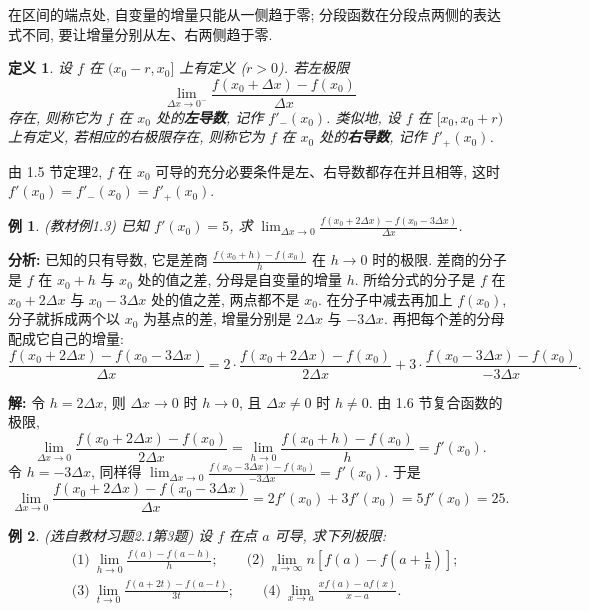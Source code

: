 \documentclass[UTF8,openany]{ctexbook}
\theoremstyle{chinesetextbook}
\newtheorem{definition}{定义}[section]
\newtheorem{example}{例}[section]
\newenvironment{cnsolution}{\par\indent\textbf{解:} \ignorespaces}{\par}
\begin{document}
在区间的端点处, 自变量的增量只能从一侧趋于零; 分段函数在分段点两侧的表达式不同, 要让增量分别从左、右两侧趋于零.
\begin{definition}
设 $f$ 在 $(x_0-r,x_0]$ 上有定义 ($r>0$). 若左极限
\[
\lim_{\Delta x\to0^-}\frac{f(x_0+\Delta x)-f(x_0)}{\Delta x}
\]
存在, 则称它为 $f$ 在 $x_0$ 处的\textbf{左导数}, 记作 $f'_-(x_0)$. 类似地, 设 $f$ 在 $[x_0,x_0+r)$ 上有定义, 若相应的右极限存在, 则称它为 $f$ 在 $x_0$ 处的\textbf{右导数}, 记作 $f'_+(x_0)$.
\end{definition}
由 1.5 节定理2, $f$ 在 $x_0$ 可导的充分必要条件是左、右导数都存在并且相等, 这时 $f'(x_0)=f'_-(x_0)=f'_+(x_0)$.
\begin{example}\label{ex:c2-1-3}
\textnormal{(教材例1.3)} 已知 $f'(x_0)=5$, 求 $\displaystyle\lim_{\Delta x\to0}\frac{f(x_0+2\Delta x)-f(x_0-3\Delta x)}{\Delta x}$.
\end{example}
\par\indent\textbf{分析:} 已知的只有导数, 它是差商 $\displaystyle\frac{f(x_0+h)-f(x_0)}h$ 在 $h\to0$ 时的极限. 差商的分子是 $f$ 在 $x_0+h$ 与 $x_0$ 处的值之差, 分母是自变量的增量 $h$. 所给分式的分子是 $f$ 在 $x_0+2\Delta x$ 与 $x_0-3\Delta x$ 处的值之差, 两点都不是 $x_0$. 在分子中减去再加上 $f(x_0)$, 分子就拆成两个以 $x_0$ 为基点的差, 增量分别是 $2\Delta x$ 与 $-3\Delta x$. 再把每个差的分母配成它自己的增量:
\[
\frac{f(x_0+2\Delta x)-f(x_0-3\Delta x)}{\Delta x}=2\cdot\frac{f(x_0+2\Delta x)-f(x_0)}{2\Delta x}+3\cdot\frac{f(x_0-3\Delta x)-f(x_0)}{-3\Delta x}.
\]
\begin{cnsolution}
令 $h=2\Delta x$, 则 $\Delta x\to0$ 时 $h\to0$, 且 $\Delta x\ne0$ 时 $h\ne0$. 由 1.6 节复合函数的极限,
\[
\lim_{\Delta x\to0}\frac{f(x_0+2\Delta x)-f(x_0)}{2\Delta x}=\lim_{h\to0}\frac{f(x_0+h)-f(x_0)}h=f'(x_0).
\]
令 $h=-3\Delta x$, 同样得 $\displaystyle\lim_{\Delta x\to0}\frac{f(x_0-3\Delta x)-f(x_0)}{-3\Delta x}=f'(x_0)$. 于是
\[
\lim_{\Delta x\to0}\frac{f(x_0+2\Delta x)-f(x_0-3\Delta x)}{\Delta x}=2f'(x_0)+3f'(x_0)=5f'(x_0)=25.
\]
\end{cnsolution}
\begin{example}\label{ex:c2-h1-3}
\textnormal{(选自教材习题2.1第3题)} 设 $f$ 在点 $a$ 可导, 求下列极限:
\[
\begin{aligned}
&\text{(1)}\ \lim_{h\to0}\frac{f(a)-f(a-h)}h;\qquad\text{(2)}\ \lim_{n\to\infty}n\left[f(a)-f\left(a+\frac1n\right)\right];\\
&\text{(3)}\ \lim_{t\to0}\frac{f(a+2t)-f(a-t)}{3t};\qquad\text{(4)}\ \lim_{x\to a}\frac{xf(a)-af(x)}{x-a}.
\end{aligned}
\]
\end{example}
\end{document}
